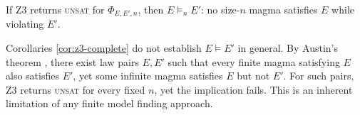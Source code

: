 \begin{corollary}\label{cor:z3-complete}
If Z3 returns \textsc{unsat} for $\Phi_{E,E',n}$, then $E \models_n E'$: no size-$n$
magma satisfies $E$ while violating $E'$.
\end{corollary}

\begin{remark}\label{rem:infinite}
Corollaries \ref{cor:z3-complete} do not establish $E \models E'$ in general.  By
Austin's theorem \cite{austin1979equational}, there exist law pairs $E, E'$ such that
every finite magma satisfying $E$ also satisfies $E'$, yet some infinite magma
satisfies $E$ but not $E'$.  For such pairs, Z3 returns \textsc{unsat} for every
fixed $n$, yet the implication fails.  This is an inherent limitation of any finite
model finding approach.
\end{remark}
